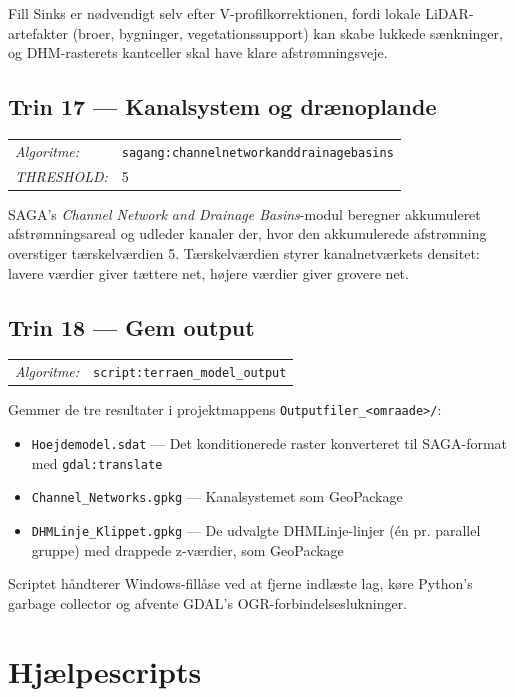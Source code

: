 Fill Sinks er nødvendigt selv efter V-profilkorrektionen, fordi lokale
LiDAR-artefakter (broer, bygninger, vegetationssupport) kan skabe lukkede
sænkninger, og DHM-rasterets kantceller skal have klare afstrømningsveje.

\subsection{Trin 17 — Kanalsystem og drænoplande}

\begin{tabular}{ll}
  \textit{Algoritme:} & \texttt{sagang:channelnetworkanddrainagebasins} \\
  \textit{THRESHOLD:} & 5 \\
\end{tabular}

\medskip
SAGA's \textit{Channel Network and Drainage Basins}-modul beregner akkumuleret
afstrømningsareal og udleder kanaler der, hvor den akkumulerede afstrømning
overstiger tærskelværdien 5. Tærskelværdien styrer kanalnetværkets densitet:
lavere værdier giver tættere net, højere værdier giver grovere net.

\subsection{Trin 18 — Gem output}

\begin{tabular}{ll}
  \textit{Algoritme:} & \texttt{script:terraen\_model\_output} \\
\end{tabular}

\medskip
Gemmer de tre resultater i projektmappens \texttt{Outputfiler\_<omraade>/}:
\begin{itemize}
  \item \texttt{Hoejdemodel.sdat} — Det konditionerede raster konverteret til
        SAGA-format med \texttt{gdal:translate}
  \item \texttt{Channel\_Networks.gpkg} — Kanalsystemet som GeoPackage
  \item \texttt{DHMLinje\_Klippet.gpkg} — De udvalgte DHMLinje-linjer (én pr.
        parallel gruppe) med drappede z-værdier, som GeoPackage
\end{itemize}
Scriptet håndterer Windows-fillåse ved at fjerne indlæste lag, køre Python's
garbage collector og afvente GDAL's OGR-forbindelseslukninger.


\section{Hjælpescripts}

